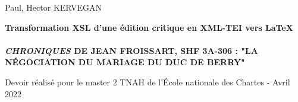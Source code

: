 \documentclass[12pt, a4paper]{article}
\begin{document}
            
            
            \begin{titlepage}
            \begin{center}
            \large
            Paul, Hector KERVEGAN
            
            \Large
            \vfill
            \textbf{Transformation XSL d'une édition critique en XML-TEI vers \LaTeX}
            \\~\\
            \textbf{\textit{CHRONIQUES} DE JEAN FROISSART, SHF 3A-306 : "LA NÉGOCIATION DU MARIAGE DU DUC DE BERRY"}
            \vfill
            
            \large	
            \vfill Devoir réalisé pour le master 2 TNAH de l'École nationale des Chartes - Avril 2022
            \end{center}
            \end{titlepage}
            
            
\end{document}
